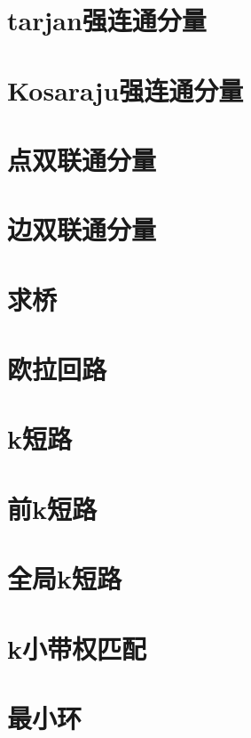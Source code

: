 \section{tarjan强连通分量}
\raggedbottom
\hrulefill
\section{Kosaraju强连通分量}
\raggedbottom
\hrulefill
\section{点双联通分量}
\raggedbottom
\hrulefill
\section{边双联通分量}
\raggedbottom
\hrulefill
\section{求桥}
\raggedbottom
\hrulefill
\section{欧拉回路}
\raggedbottom
\hrulefill
\section{k短路}
\raggedbottom
\hrulefill
\section{前k短路}
\raggedbottom
\hrulefill
\section{全局k短路}
\raggedbottom
\hrulefill
\section{k小带权匹配}
\raggedbottom
\hrulefill
\section{最小环}
\raggedbottom
\hrulefill
